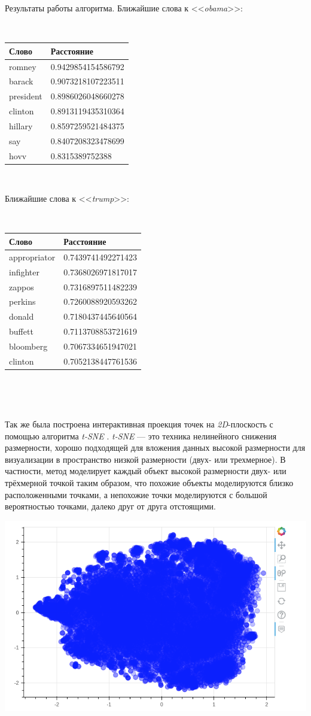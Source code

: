 Результаты работы алгоритма. Ближайшие слова к <<\textit{obama}>>:

$ $

\begin{tabular}{ | l | l | }
\hline
Слово & Расстояние \\ \hline
romney & 0.9429854154586792 \\ \hline
barack & 0.9073218107223511 \\ \hline
president & 0.8986026048660278 \\ \hline
clinton & 0.8913119435310364 \\ \hline
hillary & 0.8597259521484375 \\ \hline
say & 0.8407208323478699 \\ \hline
hovv & 0.8315389752388 \\ \hline
\end{tabular}

$ $

Ближайшие слова к <<\textit{trump}>>:

$ $

\begin{tabular}{ | l | l | }
\hline
Слово & Расстояние \\ \hline
appropriator & 0.7439741492271423 \\ \hline
infighter & 0.7368026971817017 \\ \hline
zappos & 0.7316897511482239 \\ \hline
perkins & 0.7260088920593262 \\ \hline
donald & 0.7180437445640564 \\ \hline
buffett &  0.7113708853721619 \\ \hline
bloomberg & 0.7067334651947021 \\ \hline
clinton &  0.7052138447761536 \\ \hline
\end{tabular}

$ $

$  $

Так же была построена интерактивная проекция точек на \textit{2D}-плоскость с помощью алгоритма \textit{t-SNE} \cite{bib7}. \textit{t-SNE} --- это техника нелинейного снижения размерности, хорошо подходящей для вложения данных высокой размерности для визуализации в пространство низкой размерности (двух- или трехмерное). В частности, метод моделирует каждый объект высокой размерности двух- или трёхмерной точкой таким образом, что похожие объекты моделируются близко расположенными точками, а непохожие точки моделируются с большой вероятностью точками, далеко друг от друга отстоящими.

\includegraphics[scale=0.75]{points.png}
